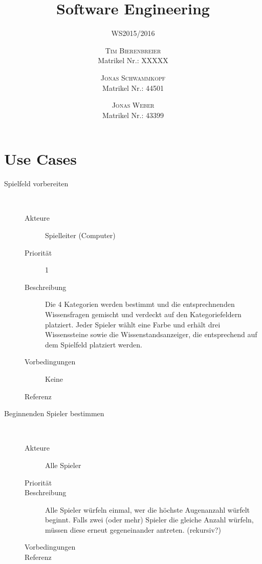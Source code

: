 \documentclass{scrartcl} %
\title{Software Engineering}
\subtitle{WS2015/2016} %
\author{
	\textsc{Tim Bierenbreier}\\
	\normalsize Matrikel Nr.: XXXXX
	\and
	\textsc{Jonas Schwammkopf}\\
	\normalsize Matrikel Nr.: 44501
	\and
	\textsc{Jonas Weber}\\
	\normalsize Matrikel Nr.: 43399
}
\begin{document}
\maketitle
\section{Use Cases}

\begin{description}
   \item[Spielfeld vorbereiten]~\par
   \begin{description}
      \item[Akteure] Spielleiter (Computer)
      \item[Priorität]  1
      \item[Beschreibung] Die 4 Kategorien werden bestimmt und die entsprechnenden Wissensfragen gemischt und verdeckt auf den Kategoriefeldern platziert. Jeder Spieler wählt eine Farbe und erhält drei Wissenssteine sowie die Wissenstandsanzeiger, die entsprechend auf dem Spielfeld platziert werden.
      \item[Vorbedingungen] Keine
      \item[Referenz] 
   \end{description}
\end{description}
\begin{description}
   \item[Beginnenden Spieler bestimmen]~\par
   \begin{description}
      \item[Akteure] Alle Spieler
      \item[Priorität]  
      \item[Beschreibung] Alle Spieler würfeln einmal, wer die höchste Augenanzahl würfelt beginnt. Falls zwei (oder mehr) Spieler die gleiche Anzahl würfeln, müssen diese erneut gegeneinander antreten. (rekursiv?)
      \item[Vorbedingungen] 
      \item[Referenz] 
   \end{description}
\end{description}
\end{document}
